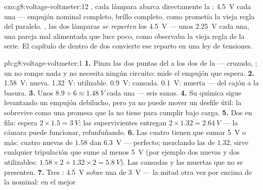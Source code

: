 \begin{solution}{exo:g8:voltage-voltmeter:12}
, cada lámpara abarca directamente la
: \qty{4.5}{V} cada una --- empujón nominal completo, brillo
completo, como prometía la vieja regla del paralelo. , las
dos lámparas \emph{se reparten} los \qty{4.5}{V} --- unos
\qty{2.25}{V} cada una, una pareja mal alimentada que luce poco, como
observaba la vieja regla de la serie. El capítulo de dentro de dos
convierte ese reparto en una ley de tensiones.
\end{solution}

\begin{solution}{pb:g8:voltage-voltmeter:1}
\textbf{1.} Pinza las dos puntas del  a los dos
 de la  --- cruzado, ; un
 no rompe nada y no necesita ningún circuito:
mide el empujón que espera.
\textbf{2.} \qty{1.58}{V}: nueva. \qty{1.32}{V}: utilizable.
\qty{0.9}{V}: cansada. \qty{0.1}{V}: muerta --- del cajón a la
basura.
\textbf{3.} Unos $8.9 \div 6 \approx \qty{1.48}{V}$ cada una --- seis
 sanas.
\textbf{4.} Su química sigue levantando un empujón debilucho, pero ya
no puede mover un desfile útil: la  sobrevive como una
promesa que la  no tiene  para cumplir bajo carga.
\textbf{5.} Dos en fila: espera $2 \times 1.5 = \qty{3}{V}$; las
supervivientes entregan $2 \times 1.32 = \qty{2.64}{V}$ --- la cámara
puede funcionar, refunfuñando.
\textbf{6.} Las cuatro  tienen que sumar \qty{5}{V} o más: cuatro
nuevas de $1.58$ dan \qty{6.3}{V} --- perfecto; mezclando las de
$1.32$, sirve cualquier tripulación que sume al menos \qty{5}{V} (por
ejemplo dos nuevas y dos utilizables: $1.58 \times 2 + 1.32 \times 2 =
\qty{5.8}{V}$). Las cansadas y las muertas que no se presenten.
\textbf{7.} Tres : \qty{4.5}{V} sobre una  de
\qty{3}{V} --- la mitad otra vez por encima de la nominal: en el mejor

\end{solution}
